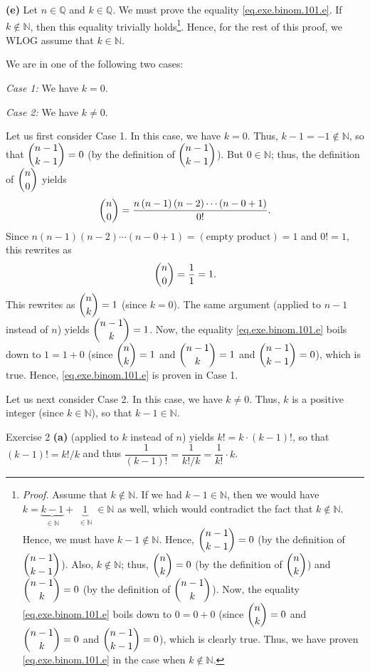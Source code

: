 \documentclass[paper=a4, fontsize=12pt]{scrartcl} %
\newcommand{\QQ}{\mathbb{Q}} %
\newcommand{\NN}{\mathbb{N}} %
\newcommand{\tup}[1]{\left( #1 \right)}
\newcommand{\underbrack}[2]{\underbrace{#1}_{\substack{#2}}}
\theoremstyle{plainsl}
\theoremstyle{definition}
\theoremstyle{remark}
\begin{document}
\textbf{(e)}
Let $n \in \QQ$ and $k \in \QQ$.
We must prove the equality \eqref{eq.exe.binom.101.e}.
If $k \notin \NN$, then this equality trivially
holds\footnote{\textit{Proof.} Assume that $k \notin \NN$.
If we had $k-1 \in \NN$, then we would have
$k = \underbrack{k-1}{\in \NN} + \underbrack{1}{\in \NN} \in \NN$
as well, which would contradict the fact that $k \notin \NN$.
Hence, we must have $k-1 \notin \NN$.
Hence, $\dbinom{n-1}{k-1} = 0$ (by the definition of
$\dbinom{n-1}{k-1}$).
Also, $k \notin \NN$; thus,
$\dbinom{n}{k} = 0$ (by the definition of $\dbinom{n}{k}$) and
$\dbinom{n-1}{k} = 0$ (by the definition of $\dbinom{n-1}{k}$).
Now, the equality \eqref{eq.exe.binom.101.e} boils down to
$0 = 0 + 0$ (since $\dbinom{n}{k} = 0$ and
$\dbinom{n-1}{k} = 0$ and $\dbinom{n-1}{k-1} = 0$), which is
clearly true.
Thus, we have proven \eqref{eq.exe.binom.101.e} in the case
when $k \notin \NN$.}.
Hence, for the rest of this proof, we WLOG assume that $k \in \NN$.

We are in one of the following two cases:

\textit{Case 1:} We have $k = 0$.

\textit{Case 2:} We have $k \neq 0$.

Let us first consider Case 1.
In this case, we have $k = 0$.
Thus, $k-1 = -1 \notin \NN$, so that $\dbinom{n-1}{k-1} = 0$
(by the definition of $\dbinom{n-1}{k-1}$).
But $0 \in \NN$; thus, the definition of $\dbinom{n}{0}$ yields
\[
\dbinom{n}{0}
= \dfrac{ n \tup{n-1} \tup{n-2} \cdots \tup{n-0+1} }{0!} .
\]
Since $n \tup{n-1} \tup{n-2} \cdots \tup{n-0+1}
= \tup{\text{empty product}} = 1$ and $0! = 1$, this rewrites as
\[
\dbinom{n}{0} = \dfrac{1}{1} = 1.
\]
This rewrites as $\dbinom{n}{k} = 1$ (since $k = 0$).
The same argument (applied to $n-1$ instead of $n$) yields
$\dbinom{n-1}{k} = 1$.
Now, the equality \eqref{eq.exe.binom.101.e} boils down to
$1 = 1 + 0$ (since $\dbinom{n}{k} = 1$ and
$\dbinom{n-1}{k} = 1$ and $\dbinom{n-1}{k-1} = 0$), which is
true.
Hence, \eqref{eq.exe.binom.101.e} is proven in Case 1.

Let us next consider Case 2.
In this case, we have $k \neq 0$.
Thus, $k$ is a positive integer (since $k \in \NN$), so that
$k-1 \in \NN$.

Exercise 2 \textbf{(a)} (applied to $k$ instead of $n$) yields
$k! = k \cdot \tup{k-1}!$, so that $\tup{k-1}! = k! / k$ and thus
$\dfrac{1}{\tup{k-1}!} = \dfrac{1}{k! / k} = \dfrac{1}{k!} \cdot k$.
\end{document}
